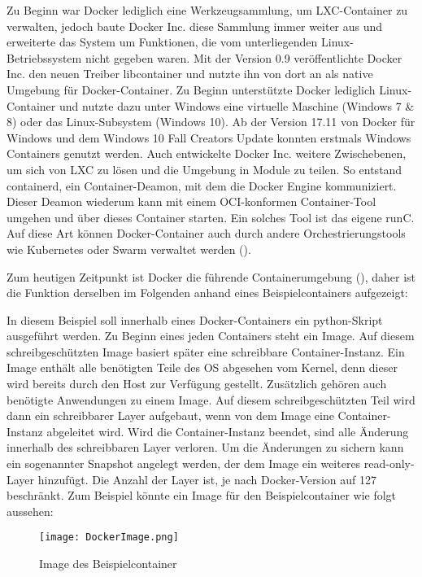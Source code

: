 Zu Beginn war Docker lediglich eine Werkzeugsammlung, um \ac{LXC}-Container zu verwalten, jedoch baute Docker Inc. diese Sammlung immer weiter aus und erweiterte das System um Funktionen, die vom unterliegenden Linux-Betriebssystem nicht gegeben waren. Mit der Version 0.9 veröffentlichte Docker Inc. den neuen Treiber libcontainer und nutzte ihn von dort an als native Umgebung für Docker-Container. \cite{dockerblog2} Zu Beginn unterstützte Docker lediglich Linux-Container und nutzte dazu unter Windows eine virtuelle Maschine (Windows 7 \& 8) oder das Linux-Subsystem (Windows 10). Ab der Version 17.11 von Docker für Windows und dem Windows 10 Fall Creators Update konnten erstmals Windows Containers genutzt werden. \cite{dockerblogwin} Auch entwickelte Docker Inc. weitere Zwischebenen, um sich von \ac{LXC} zu lösen und die Umgebung in Module zu teilen. So entstand containerd, ein Container-Deamon, mit dem die Docker Engine kommuniziert. Dieser Deamon wiederum kann mit einem OCI-konformen Container-Tool umgehen und über dieses Container starten. Ein solches Tool ist das eigene runC. Auf diese Art können Docker-Container auch durch andere Orchestrierungstools wie Kubernetes oder Swarm verwaltet werden (\Vgl {}).\cite{Buch}

Zum heutigen Zeitpunkt ist Docker die führende Containerumgebung (\Vgl {}), daher ist die Funktion derselben im Folgenden anhand eines Beispielcontainers aufgezeigt:

In diesem Beispiel soll innerhalb eines Docker-Containers ein python-Skript ausgeführt werden. Zu Beginn eines jeden Containers steht ein Image. Auf diesem schreibgeschützten Image basiert später eine schreibbare Container-Instanz. Ein Image enthält alle benötigten Teile des OS abgesehen vom Kernel, denn dieser wird bereits durch den Host zur Verfügung gestellt. Zusätzlich gehören auch benötigte Anwendungen zu einem Image. Auf diesem schreibgeschützten Teil wird dann ein schreibbarer Layer aufgebaut, wenn von dem Image eine Container-Instanz abgeleitet wird. Wird die Container-Instanz beendet, sind alle Änderung innerhalb des schreibbaren Layer verloren. Um die Änderungen zu sichern kann ein sogenannter Snapshot angelegt werden, der dem Image ein weiteres read-only-Layer hinzufügt. Die Anzahl der Layer ist, je nach Docker-Version auf 127 beschränkt. \cite{Buch, dockermanual} \newpage Zum Beispiel könnte ein Image für den Beispielcontainer wie folgt aussehen:

\begin{figure}[h]
    \begin{center}
        \texttt{[image: DockerImage.png]}
    \end{center}
    \caption[Image des Beispielcontainer ]{Image des Beispielcontainer}
    \label{fig:docker1}
    \end{figure}

